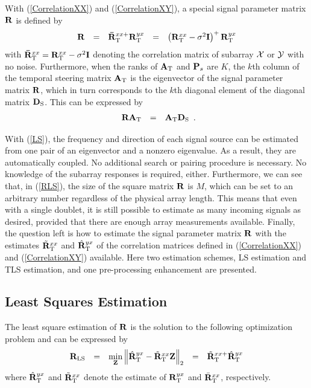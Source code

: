 \documentclass[conference]{IEEEtran}
\newcommand{\bA}{{\mathbf A}}
\newcommand{\bD}{{\bf D}}
\newcommand{\bP}{{\bf P}}
\newcommand{\bI}{{\bf I}}
\newcommand{\bR}{{\bf R}}
\newcommand{\bZ}{{\bf Z}}
\begin{document}
With (\ref{CorrelationXX}) and (\ref{CorrelationXY}), a special
signal parameter matrix $\bR$ is defined by
\begin{equation}
\begin{array}{rcccl}
\bR&=&\mathbf{\bar{R}}_{\rm T}^{xx+}\bR_{\rm
T}^{yx}&=&\left(\bR_{\rm T}^{xx}-\sigma^2\bI\right)^{+}\bR_{\rm
T}^{yx}
\end{array}\label{RLS}
\end{equation}
\noindent with $\mathbf{\bar{R}}_{\rm T}^{xx}=\bR_{\rm
T}^{xx}-\sigma^2\bI$ denoting the correlation matrix of subarray
$\cal X$ or $\cal Y$ with no noise. Furthermore, when the ranks of
$\bA_{\rm T}$ and $\bP_{s}$ are $K$, the $k$th column of the
temporal steering matrix $\bA_{\rm T}$ is the eigenvector of the
signal parameter matrix $\bR$, which in turn corresponds to the
$k$th diagonal element of the diagonal matrix $\bD_{\rm S}$. This
can be expressed by
\begin{equation}
\begin{array}{rcl}
\bR\bA_{\rm T}&=&\bA_{\rm T}\bD_{\rm S}
\end{array}.\label{LS}
\end{equation}

With (\ref{LS}), the frequency and direction of each signal source
can be estimated from one pair of an eigenvector and a nonzero
eigenvalue. As a result, they are automatically coupled. No
additional search or pairing procedure is necessary. No knowledge
of the subarray responses is required, either. Furthermore, we can
see that, in (\ref{RLS}), the size of the square matrix $\bR$ is
$M$, which can be set to an arbitrary number regardless of the
physical array length. This means that even with a single doublet,
it is still possible to estimate as many incoming signals as
desired, provided that there are enough array measurements
available. Finally, the question left is how to estimate the
signal parameter matrix $\bR$ with the estimates $\tilde{\bR}_{\rm
T}^{xx}$ and $\hat{\bR}_{\rm T}^{yx}$ of the correlation matrices
defined in (\ref{CorrelationXX}) and (\ref{CorrelationXY})
available. Here two estimation schemes, LS estimation and TLS
estimation, and one pre-processing enhancement are presented.
\subsection{Least Squares Estimation}
The least square estimation of $\bR$ is the solution to the
following optimization problem and can be expressed by
\begin{equation}
\begin{array}{rcccl}
\bR_{\rm LS }&=&\min\limits_{\bZ}\left\|\hat{\bR}_{ \rm
T}^{yx}-\tilde{\bR}_{\rm T}^{xx}\bZ\right\|_2&=&\tilde{\bR}_{\rm
T}^{xx+}\hat{\bR}_{ \rm T}^{yx}
\end{array}
\label{LS1}
\end{equation}
\noindent where $\hat{\bR}_{\rm T}^{yx}$ and $\tilde{\bR}_{\rm
T}^{xx}$ denote the estimate of ${\bR}_{\rm T}^{yx}$ and
$\bar{\bR}_{\rm T}^{xx}$, respectively.
\end{document}
